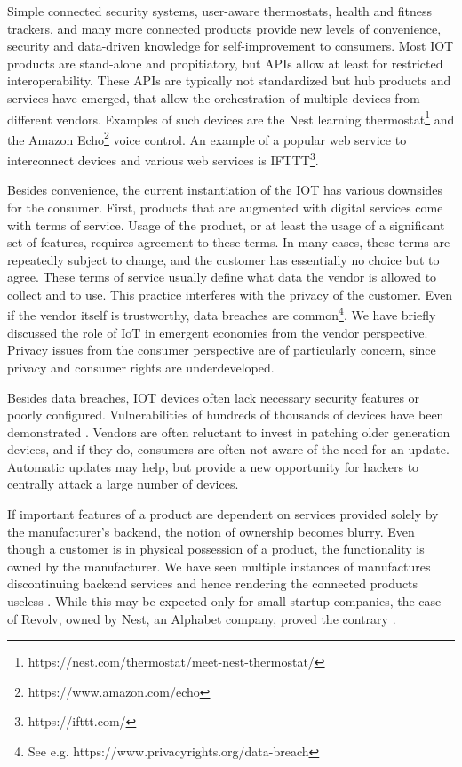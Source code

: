 Simple connected security systems, user-aware thermostats, health and fitness trackers, and many more connected products provide new levels of convenience, security and data-driven knowledge for self-improvement to consumers. Most \ac{IOT} products are stand-alone and propitiatory, but \ac{API}s allow at least for restricted interoperability. These \ac{API}s are typically not standardized but hub products and services have emerged, that allow the orchestration of multiple devices from different vendors. Examples of such devices are the Nest learning thermostat\footnote{https://nest.com/thermostat/meet-nest-thermostat/} and the Amazon Echo\footnote{https://www.amazon.com/echo} voice control. An example of a popular web service to interconnect devices and various web services is IFTTT\footnote{https://ifttt.com/}. 

Besides convenience, the current instantiation of the \ac{IOT} has various downsides for the consumer. First, products that are augmented with digital services come with terms of service. Usage of the product, or at least the usage of a significant set of features, requires agreement to these terms. In many cases, these terms are repeatedly subject to change, and the customer has essentially no choice but to agree. These terms of service usually define what data the vendor is allowed to collect and to use.
This practice interferes with the privacy of the customer. Even if the vendor itself is trustworthy, data breaches are common\footnote{See e.g. https://www.privacyrights.org/data-breach}. We have briefly discussed the role of IoT in emergent economies from the vendor perspective. Privacy issues from the consumer perspective are of particularly concern, since privacy and consumer rights are underdeveloped.

Besides data breaches, \ac{IOT} devices often lack necessary security features or poorly configured. Vulnerabilities of hundreds of thousands of devices have been demonstrated \parencite{7546527,Bodenheim2014114,184449,garcia2016lock}. Vendors are often reluctant to invest in patching older generation devices, and if they do, consumers are often not aware of the need for an update. Automatic updates may help, but provide a new opportunity for hackers to centrally attack a large number of devices.

If important features of a product are dependent on services provided solely by the manufacturer's backend, the notion of ownership becomes blurry. Even though a customer is in physical possession of a product, the functionality is owned by the manufacturer. We have seen multiple instances of manufactures discontinuing backend services and hence rendering the connected products useless \parencite{Cox2016}. While this may be expected only for small startup companies, the case of Revolv, owned by Nest, an Alphabet company, proved the contrary \parencite{Gilbert2016}.

